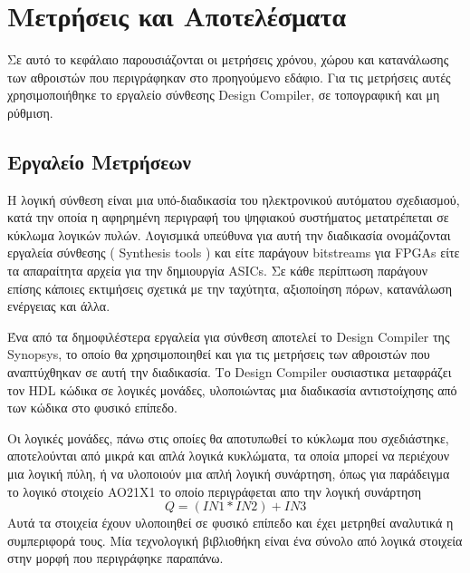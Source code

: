 \section{Μετρήσεις και Αποτελέσματα}

Σε αυτό το κεφάλαιο παρουσιάζονται οι μετρήσεις χρόνου, χώρου και κατανάλωσης των αθροιστών 
που περιγράφηκαν στο προηγούμενο εδάφιο. Για τις μετρήσεις αυτές χρησιμοποιήθηκε το εργαλείο
σύνθεσης Design Compiler, σε τοπογραφική και μη ρύθμιση.







\subsection{Εργαλείο Μετρήσεων}

Η λογική σύνθεση είναι μια υπό-διαδικασία του ηλεκτρονικού αυτόματου σχεδιασμού,
κατά την οποία η αφηρημένη περιγραφή του ψηφιακού συστήματος 
μετατρέπεται σε κύκλωμα λογικών πυλών. Λογισμικά υπεύθυνα για αυτή την διαδικασία
ονομάζονται εργαλεία σύνθεσης ( Synthesis tools ) και είτε παράγουν bitstreams για FPGAs
είτε τα απαραίτητα αρχεία για την δημιουργία ASICs. Σε κάθε περίπτωση παράγουν
επίσης κάποιες εκτιμήσεις σχετικά με την ταχύτητα, αξιοποίηση πόρων, κατανάλωση ενέργειας
και άλλα.

Ένα από τα δημοφιλέστερα εργαλεία για σύνθεση αποτελεί το Design Compiler της Synopsys,
το οποίο θα χρησιμοποιηθεί και για τις μετρήσεις των αθροιστών που αναπτύχθηκαν σε
αυτή την διαδικασία. Το Design Compiler ουσιαστικα μεταφράζει τον HDL κώδικα σε λογικές
μονάδες, υλοποιώντας μια διαδικασία αντιστοίχησης από των κώδικα στο φυσικό επίπεδο.

Οι λογικές μονάδες, πάνω στις οποίες θα αποτυπωθεί το κύκλωμα που σχεδιάστηκε, 
αποτελούνται από μικρά και απλά λογικά κυκλώματα, τα οποία μπορεί να περιέχουν 
μια λογική πύλη, ή να υλοποιούν μια απλή λογική συνάρτηση, όπως για παράδειγμα 
το λογικό στοιχείο AO21X1 το οποίο περιγράφεται απο την λογική συνάρτηση
\begin{equation*}
    Q = ( IN1 * IN2 ) + IN3
\end{equation*}
Αυτά τα στοιχεία έχουν υλοποιηθεί σε φυσικό επίπεδο και έχει μετρηθεί αναλυτικά η συμπεριφορά
τους. Μία τεχνολογική βιβλιοθήκη είναι ένα σύνολο από λογικά στοιχεία στην μορφή που περιγράφηκε
παραπάνω. 

